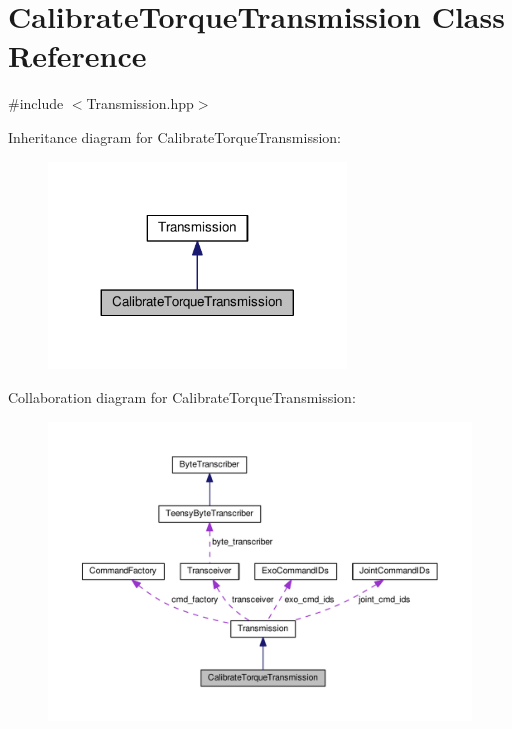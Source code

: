 \hypertarget{classCalibrateTorqueTransmission}{}\section{Calibrate\+Torque\+Transmission Class Reference}
\label{classCalibrateTorqueTransmission}


{\ttfamily \#include $<$Transmission.\+hpp$>$}



Inheritance diagram for Calibrate\+Torque\+Transmission\+:\nopagebreak
\begin{figure}[H]
\begin{center}
\leavevmode
\includegraphics[width=224pt]{classCalibrateTorqueTransmission__inherit__graph}
\end{center}
\end{figure}


Collaboration diagram for Calibrate\+Torque\+Transmission\+:\nopagebreak
\begin{figure}[H]
\begin{center}
\leavevmode
\includegraphics[width=350pt]{classCalibrateTorqueTransmission__coll__graph}
\end{center}
\end{figure}
